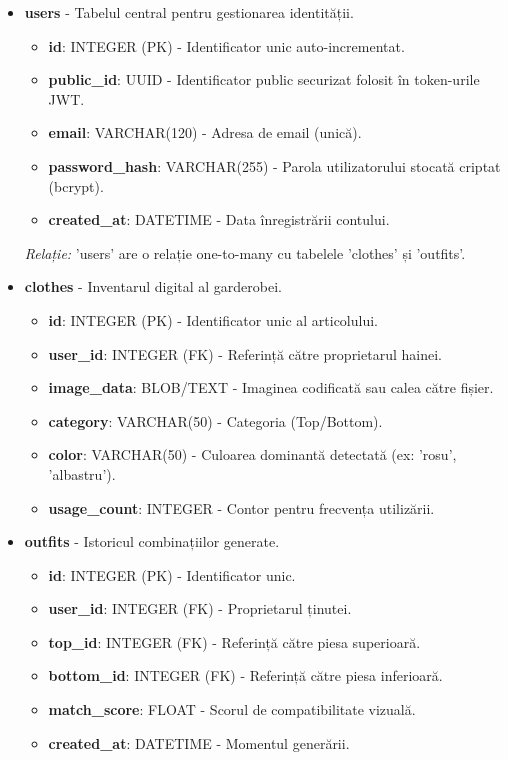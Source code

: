 \begin{itemize}
    \item \textbf{users} - Tabelul central pentru gestionarea identității.
    \begin{itemize}
        \item \textbf{id}: INTEGER (PK) - Identificator unic auto-incrementat.
        \item \textbf{public\_id}: UUID - Identificator public securizat folosit în token-urile JWT.
        \item \textbf{email}: VARCHAR(120) - Adresa de email (unică).
        \item \textbf{password\_hash}: VARCHAR(255) - Parola utilizatorului stocată criptat (bcrypt).
        \item \textbf{created\_at}: DATETIME - Data înregistrării contului.
    \end{itemize}
    \textit{Relație:} 'users' are o relație one-to-many cu tabelele 'clothes' și 'outfits'.

    \item \textbf{clothes} - Inventarul digital al garderobei.
    \begin{itemize}
        \item \textbf{id}: INTEGER (PK) - Identificator unic al articolului.
        \item \textbf{user\_id}: INTEGER (FK) - Referință către proprietarul hainei.
        \item \textbf{image\_data}: BLOB/TEXT - Imaginea codificată sau calea către fișier.
        \item \textbf{category}: VARCHAR(50) - Categoria (Top/Bottom).
        \item \textbf{color}: VARCHAR(50) - Culoarea dominantă detectată (ex: 'rosu', 'albastru').
        \item \textbf{usage\_count}: INTEGER - Contor pentru frecvența utilizării.
    \end{itemize}
    
    \item \textbf{outfits} - Istoricul combinațiilor generate.
    \begin{itemize}
        \item \textbf{id}: INTEGER (PK) - Identificator unic.
        \item \textbf{user\_id}: INTEGER (FK) - Proprietarul ținutei.
        \item \textbf{top\_id}: INTEGER (FK) - Referință către piesa superioară.
        \item \textbf{bottom\_id}: INTEGER (FK) - Referință către piesa inferioară.
        \item \textbf{match\_score}: FLOAT - Scorul de compatibilitate vizuală.
        \item \textbf{created\_at}: DATETIME - Momentul generării.
    \end{itemize}
\end{itemize}

